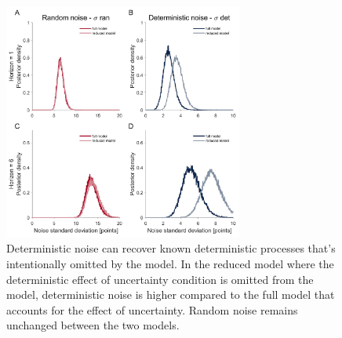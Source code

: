 \documentclass[12pt]{article}
\begin{document}
{\begin{figure}[H]
\begin{center}
	\includegraphics[width=0.7\textwidth]{figures/RDBayes_reduced_model.jpg}
	\caption{Deterministic noise can recover known deterministic processes that's intentionally omitted by the model. In the reduced model where the deterministic effect of uncertainty condition is omitted from the model, deterministic noise is higher compared to the full model that accounts for the effect of uncertainty. Random noise remains unchanged between the two models.}
	\label{fig:reducedmodel}
\end{center}
\end{figure} 

}
\end{document}

